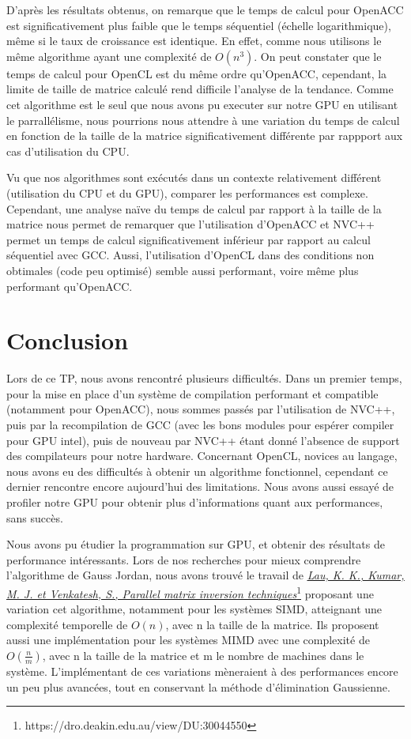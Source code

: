 \documentclass[a4paper, french]{article}
\begin{document}
D'après les résultats obtenus, on remarque que le temps de calcul pour OpenACC est significativement plus faible que le temps séquentiel (échelle logarithmique), même si le taux de croissance est identique. En effet, comme nous utilisons le même algorithme ayant une complexité de $O(n^3)$. On peut constater que le temps de calcul pour OpenCL est du même ordre qu'OpenACC, cependant, la limite de taille de matrice calculé rend difficile l'analyse de la tendance. Comme cet algorithme est le seul que nous avons
pu executer sur notre GPU en utilisant le parrallélisme, nous pourrions nous attendre à une
variation du temps de calcul en fonction de la taille de la matrice significativement différente par rappport aux cas d’utilisation du CPU.

Vu que nos algorithmes sont exécutés dans un contexte relativement différent (utilisation du CPU et du GPU), comparer les performances est complexe. Cependant, une analyse naïve du temps de calcul par rapport à la taille de la matrice nous permet de remarquer que l'utilisation d'OpenACC et NVC++ permet un temps de calcul significativement inférieur par rapport au calcul séquentiel avec GCC. Aussi, l'utilisation d'OpenCL dans des conditions non obtimales (code peu optimisé) semble aussi performant, voire même plus performant qu'OpenACC.

\section{Conclusion}

Lors de ce TP, nous avons rencontré plusieurs difficultés. Dans un premier temps, pour la mise en place d'un système de compilation performant et compatible (notamment pour OpenACC), nous sommes passés par l'utilisation de NVC++, puis par la recompilation de GCC (avec les bons modules pour espérer compiler pour GPU intel), puis de nouveau par NVC++ étant donné l'absence de support des compilateurs pour notre hardware. Concernant OpenCL, novices au langage, nous avons eu des difficultés à obtenir un algorithme fonctionnel, cependant ce dernier rencontre encore aujourd'hui des limitations. Nous avons aussi essayé de profiler notre GPU pour obtenir plus d'informations quant aux performances, sans succès.

Nous avons  pu étudier la programmation sur GPU, et obtenir des résultats de performance intéressants.
Lors de nos recherches pour mieux comprendre l'algorithme de Gauss Jordan, nous avons trouvé le travail de \href{https://dro.deakin.edu.au/view/DU:30044550}{\textit{\underline{Lau, K. K., Kumar, M. J. et Venkatesh, S., Parallel matrix inversion techniques}}}\footnote{https://dro.deakin.edu.au/view/DU:30044550} proposant une variation cet algorithme, notamment pour les systèmes SIMD, atteignant une complexité temporelle de $O(n)$, avec n la taille de la matrice. Ils proposent aussi une implémentation pour les systèmes MIMD avec une complexité de $O(\frac{n}{m})$, avec n la taille de la matrice et m le nombre de machines dans le système. L'implémentant de ces variations mèneraient à des performances encore un peu plus avancées, tout en conservant la méthode d'élimination Gaussienne.
\end{document}
